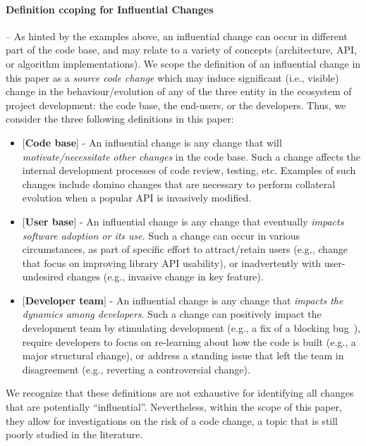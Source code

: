 \paragraph*{\bf Definition ccoping for Influential Changes} -- As hinted by the examples above, 
an influential change can occur in different part of the code base, and may relate to a variety
of concepts (architecture, API, or algorithm implementations). We scope the definition of an influential
change in this paper as a {\em source code change} which may induce significant (i.e., visible) change 
in the behaviour/evolution of any of the three entity in the ecosystem of project development: the code base, the end-users, or the developers. Thus, we consider the three following definitions in this paper:
\begin{itemize}
	\item {\bf $[$Code base$]$} - An influential change is any change that will {\em motivate/necessitate other changes} in the code base. Such a change affects the internal development processes of code review, testing, etc. Examples of such changes include domino changes that are necessary to perform collateral evolution when a popular API is invasively modified.
	\item {\bf $[$User base$]$} - An influential change is any change that eventually {\em impacts software adoption or its use}.  Such a change can occur in various circumstances, as part of specific effort to attract/retain users (e.g., change that focus on improving library API usability), or inadvertently with user-undesired changes (e.g., invasive change in key feature).
	\item {\bf $[$Developer team$]$} - An influential change is any change that {\em impacts the dynamics among developers}. Such a change can positively impact the development team by stimulating development (e.g., a fix of a blocking bug~\cite{ValdiviaGarcia:2014:CPB:2597073.2597099}), require developers to focus on re-learning about how the code is built (e.g., a major structural change), or address a standing issue that left the team in disagreement (e.g., reverting a controversial change).
\end{itemize}

We recognize that these definitions are not exhaustive for identifying all changes that are potentially ``influential''. Nevertheless, within the scope of this paper, they allow for investigations on the risk of a code change, a topic that is still poorly studied in the literature.
